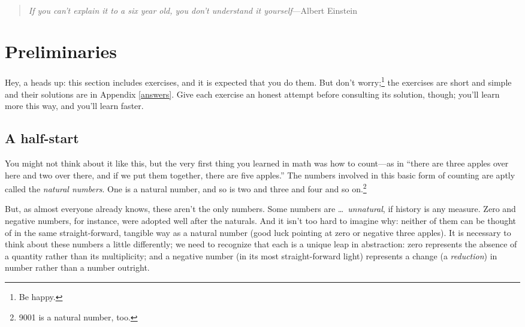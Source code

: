 \documentclass{book}
\theoremstyle{definition}
\theoremstyle{colonstylebf}
\begin{document}
\newpage

$\phantom{\scalebox{72}{A}}$

\begin{flushright}
\begin{quote}
\emph{If you can't explain it to a six year old, you don't understand it yourself}---Albert Einstein
\end{quote}
\end{flushright}

\chapter{Preliminaries}\label{prelim}
Hey, a heads up: this section includes exercises, and it is expected that you do them. But don't worry;\footnote{Be happy.} the exercises are short and simple and their solutions are in Appendix \ref{answers}. Give each exercise an honest attempt before consulting its solution, though; you'll learn more this way, and you'll learn faster.


\section{A half-start}
You might not think about it like this, but the very first thing you learned in math was how to count---as in ``there are three
apples over here and two over there, and if we put them together, there are five apples.'' The numbers involved in this basic form of counting are aptly called the \emph{natural numbers}. One is a natural number, and so is two and three and four and so on.\footnote{9001 is a natural number, too.}

But, as almost everyone already knows, these aren't the only numbers. Some numbers are \dots \emph{\ \!unnatural}, if history is any measure. Zero and negative numbers, for instance, were adopted well after the naturals. And it isn't too hard to imagine why: neither of them can be thought of in the same straight-forward, tangible way as a natural number (good luck pointing at zero or negative three apples). It is necessary to think about these numbers a little differently; we need to recognize that each is a unique leap in abstraction: zero represents the absence of a quantity rather than its multiplicity; and a negative number (in its most straight-forward light) represents a change (a \emph{reduction}) in number rather than a number outright.
\end{document}
